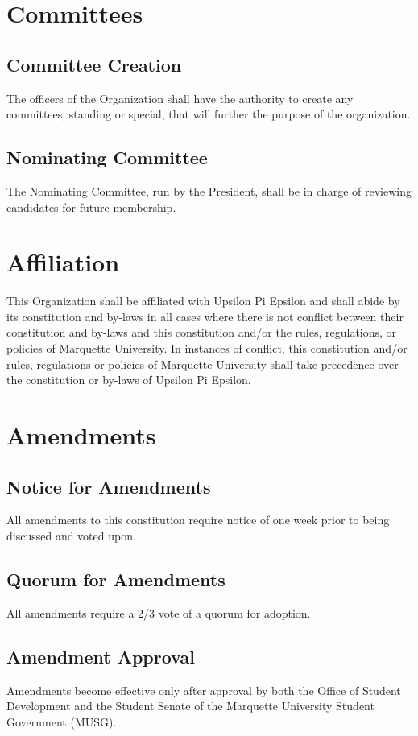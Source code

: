 \documentclass{article}
\begin{document}
\section{Committees}
\subsection{Committee Creation}
The officers of the Organization shall have the authority to create any
committees, standing or special, that will further the purpose of the
organization.
\subsection{Nominating Committee}
The Nominating Committee, run by the President, shall be in charge of reviewing candidates for future membership.

\section{Affiliation}
This Organization shall be affiliated with Upsilon Pi Epsilon and shall abide by its constitution and by-laws in all cases where there is not conflict between their constitution and by-laws and this constitution and/or the rules, regulations, or policies of Marquette University. In instances of conflict, this constitution and/or rules, regulations or policies of Marquette University shall take precedence over the constitution or by-laws of Upsilon Pi Epsilon.

\section{Amendments}
\subsection{Notice for Amendments}
All amendments to this constitution require notice of one week prior to being discussed and voted upon.
\subsection{Quorum for Amendments}
All amendments require a 2/3 vote of a quorum for adoption.
\subsection{Amendment Approval}
Amendments become effective only after approval by both the Office of Student
Development and the Student Senate of the Marquette University Student
Government (MUSG).
\end{document}

